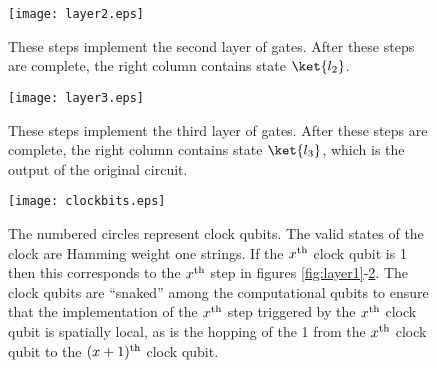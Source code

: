 \documentclass[11pt]{article}
\begin{document}
\begin{figure}[ht]
\begin{center}
\texttt{[image: layer2.eps]}
\caption{These steps implement the second layer of gates. After these steps are complete, the right column contains state $\ket{l_2}$.
\label{fig:layer2}}
\end{center}
\end{figure}

\begin{figure}[ht]
\begin{center}
\texttt{[image: layer3.eps]}
\caption{These steps implement the third layer of gates. After these steps are complete, the right column contains state $\ket{l_3}$, which is the output of the original circuit.
\label{fig:layer3}}
\end{center}
\end{figure}

\begin{figure}[ht]
\begin{center}
\texttt{[image: clockbits.eps]}
\caption{The numbered circles represent clock qubits. The valid states of the clock are Hamming weight one strings. If the $x^\mathrm{th}$ clock qubit is 1 then this corresponds to the $x^\mathrm{th}$ step in figures \ref{fig:layer1}-\ref{fig:layer3}. The clock qubits are ``snaked'' among the computational qubits to ensure that the implementation of the $x^\mathrm{th}$ step triggered by the $x^\mathrm{th}$ clock qubit is spatially local, as is the hopping of the 1 from the $x^\mathrm{th}$ clock qubit to the $(x+1)^\mathrm{th}$ clock qubit.\label{fig:layout}}
\end{center}
\end{figure}

\clearpage


\end{document}
